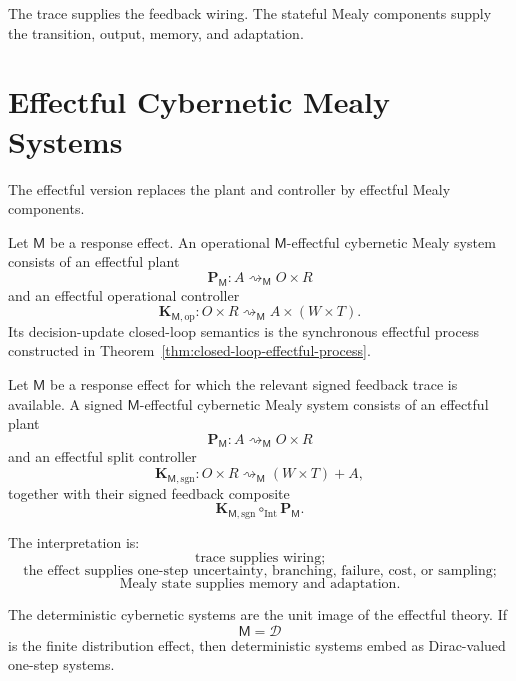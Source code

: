 The trace supplies the feedback wiring.  The stateful Mealy components supply the transition,
output, memory, and adaptation.

\section{Effectful Cybernetic Mealy Systems}
\label{sec:effectful-cybernetic-mealy-systems}

The effectful version replaces the plant and controller by effectful Mealy components.

\begin{definition}
\label{def:operational-effectful-cybernetic-mealy-system}
Let \(\mathsf M\) be a response effect.  An operational \(\mathsf M\)-effectful cybernetic Mealy
system consists of an effectful plant
\[
\mathbf P_{\mathsf M}:A\rightsquigarrow_{\mathsf M}O\times R
\]
and an effectful operational controller
\[
\mathbf K_{\mathsf M,\mathrm{op}}:O\times R\rightsquigarrow_{\mathsf M}A\times(W\times T).
\]
Its decision-update closed-loop semantics is the synchronous effectful process constructed in
Theorem~\ref{thm:closed-loop-effectful-process}.
\end{definition}

\begin{definition}
\label{def:signed-effectful-cybernetic-mealy-system}
Let \(\mathsf M\) be a response effect for which the relevant signed feedback trace is available.
A signed \(\mathsf M\)-effectful cybernetic Mealy system consists of an effectful plant
\[
\mathbf P_{\mathsf M}:A\rightsquigarrow_{\mathsf M}O\times R
\]
and an effectful split controller
\[
\mathbf K_{\mathsf M,\mathrm{sgn}}:O\times R\rightsquigarrow_{\mathsf M}(W\times T)+A,
\]
together with their signed feedback composite
\[
\mathbf K_{\mathsf M,\mathrm{sgn}}\circ_{\mathrm{Int}}\mathbf P_{\mathsf M}.
\]
\end{definition}

The interpretation is:
\[
\boxed{
\text{trace supplies wiring;}
}
\]
\[
\boxed{
\text{the effect supplies one-step uncertainty, branching, failure, cost, or sampling;}
}
\]
\[
\boxed{
\text{Mealy state supplies memory and adaptation.}
}
\]

The deterministic cybernetic systems are the unit image of the effectful theory.  If
\[
\mathsf M=\mathcal D
\]
is the finite distribution effect, then deterministic systems embed as Dirac-valued one-step
systems.

